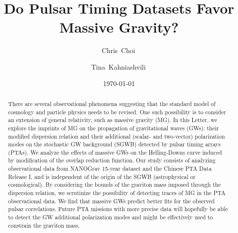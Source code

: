 \documentclass[prd,twocolumn,aps,psfig,nofootinbib,nobibnotes,superscriptaddress,preprintnumbers,times]{revtex4-2}
\begin{document}
\title{Do Pulsar Timing Datasets Favor Massive Gravity?}

\date{\today}
\author{Chris~Choi\,}

\author{Tina~Kahniashvili\,}

\begin{abstract}

There are several observational phenomena suggesting that the standard model of cosmology and particle physics needs to be revised. One such possibility is to consider an extension of general relativity, such as massive gravity (MG). In this Letter, we explore the imprints of MG on the propagation of gravitational waves (GWs): their modified dispersion relation and their additional (scalar- and two-vector) polarization modes on the stochastic GW background (SGWB) detected by pulsar timing arrays (PTAs). We analyze the effects of massive GWs on the Helling-Downs curve induced by modification of the overlap reduction function. Our study consists of analyzing observational data from NANOGrav 15-year dataset and the Chinese PTA Data Release I, and is independent of the origin of the SGWB (astrophysical or cosmological).  
By considering the bounds of the graviton mass imposed through the dispersion relation, 
we scrutinize the possibility of detecting traces of MG in the PTA observational data.  
We find that massive GWs predict better fits for the observed pulsar correlations. Future PTA missions 
with more precise data will hopefully be able to detect the GW additional polarization modes and 
might be effectively used to constrain the graviton mass.
\end{abstract}
\end{document}
